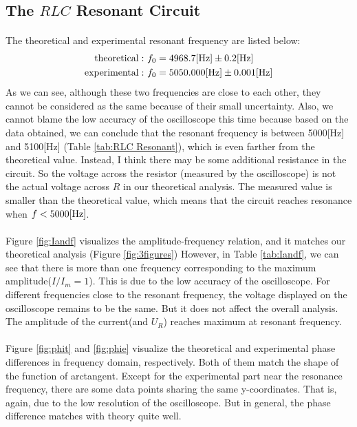 \documentclass{my_template}
\begin{document}
    \subsection{The $RLC$ Resonant Circuit}
    \paragraph{} The theoretical and experimental resonant frequency are listed below: 
    \begin{equation*}
        \begin{split}
            {\rm theoretical}:\ &f_0=4968.7[{\rm Hz}]\pm 0.2[{\rm Hz}]\\
            {\rm experimental}:\ &f_0=5050.000[{\rm Hz}]\pm 0.001[{\rm Hz}]\\
        \end{split}
    \end{equation*}
    As we can see, although these two frequencies are close to each other, they cannot be considered as the same because of their small uncertainty. Also, we cannot blame the low accuracy of the oscilloscope this time because based on the data obtained, we can conclude that the resonant frequency is between 5000[Hz] and 5100[Hz] (Table \ref{tab:RLC Resonant}), which is even farther from the theoretical value. Instead, I think there may be some additional resistance in the circuit. So the voltage across the resistor (measured by the oscilloscope) is not the actual voltage across $R$ in our theoretical analysis. The measured value is smaller than the theoretical value, which means that the circuit reaches resonance when $f<5000[\rm Hz]$. 
    \vspace{-5mm}
    \paragraph{} Figure \ref{fig:Iandf} visualizes the amplitude-frequency relation, and it matches our theoretical analysis (Figure \ref{fig:3figures}) However, in Table \ref{tab:Iandf}, we can see that there is more than one frequency corresponding to the maximum amplitude($I/I_m=1$). This is due to the low accuracy of the oscilloscope. For different frequencies close to the resonant frequency, the voltage displayed on the oscilloscope remains to be the same. But it does not affect the overall analysis. The amplitude of the current(and $U_R$) reaches maximum at resonant frequency.
    \vspace{-5mm}
    \paragraph{} Figure \ref{fig:phit} and \ref{fig:phie} visualize the theoretical and experimental phase differences in frequency domain, respectively. Both of them match the shape of the function of arctangent. Except for the experimental part near the resonance frequency, there are some data points sharing the same y-coordinates. That is, again, due to the low resolution of the oscilloscope. But in general, the phase difference matches with theory quite well.
    \vspace{-5mm}
\end{document}
